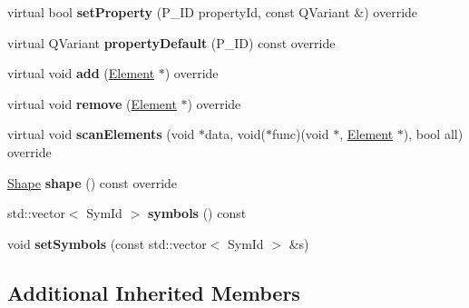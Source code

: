 \begin{DoxyCompactItemize}
\item 
\mbox{\label{class_ms_1_1_trill_segment_a8f3446d974996e1408ff3e36332ac96b}} 
virtual bool {\bfseries set\+Property} (P\+\_\+\+ID property\+Id, const Q\+Variant \&) override
\item 
\mbox{\label{class_ms_1_1_trill_segment_acd32f679110fb67ec5195e671c9edb88}} 
virtual Q\+Variant {\bfseries property\+Default} (P\+\_\+\+ID) const override
\item 
\mbox{\label{class_ms_1_1_trill_segment_a3c24d71653d7c552026162606e32206d}} 
virtual void {\bfseries add} (\hyperlink{class_ms_1_1_element}{Element} $\ast$) override
\item 
\mbox{\label{class_ms_1_1_trill_segment_a4fc59f0f76d1576026741e6be5359b21}} 
virtual void {\bfseries remove} (\hyperlink{class_ms_1_1_element}{Element} $\ast$) override
\item 
\mbox{\label{class_ms_1_1_trill_segment_aaaa2f6e7ccae202de242d115ff277def}} 
virtual void {\bfseries scan\+Elements} (void $\ast$data, void($\ast$func)(void $\ast$, \hyperlink{class_ms_1_1_element}{Element} $\ast$), bool all) override
\item 
\mbox{\label{class_ms_1_1_trill_segment_a193f194c95d179020b1c92fa13b8bbac}} 
\hyperlink{class_ms_1_1_shape}{Shape} {\bfseries shape} () const override
\item 
\mbox{\label{class_ms_1_1_trill_segment_a07e10e9e6544e4fc74703e0851312f75}} 
std\+::vector$<$ Sym\+Id $>$ {\bfseries symbols} () const
\item 
\mbox{\label{class_ms_1_1_trill_segment_a4100480265e40020c4b9fac3d04a4759}} 
void {\bfseries set\+Symbols} (const std\+::vector$<$ Sym\+Id $>$ \&s)
\end{DoxyCompactItemize}
\subsection*{Additional Inherited Members}


